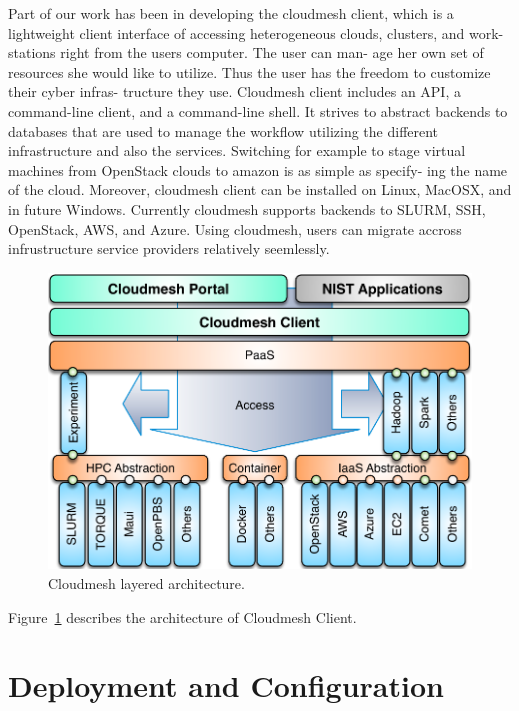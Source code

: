 \documentclass[9pt,twocolumn,twoside]{styles/osajnl}
\begin{document}
Part of our work has been in developing the cloudmesh client, which is
a lightweight client interface of accessing heterogeneous clouds,
clusters, and work- stations right from the users computer. The user
can man- age her own set of resources she would like to utilize. Thus
the user has the freedom to customize their cyber infras- tructure
they use. Cloudmesh client includes an API, a command-line client, and
a command-line shell. It strives to abstract backends to databases
that are used to manage the workflow utilizing the different
infrastructure and also the services. Switching for example to stage
virtual machines from OpenStack clouds to amazon is as simple as
specify- ing the name of the cloud. Moreover, cloudmesh client can be
installed on Linux, MacOSX, and in future Windows.  Currently
cloudmesh supports backends to SLURM, SSH, OpenStack, AWS, and
Azure. Using cloudmesh, users can migrate accross infrustructure
service providers relatively seemlessly.


\begin{figure}[htb]
  \centering
     \includegraphics[width=1.0\columnwidth]{images/cloudmesh-arch-1.pdf}
  \caption{Cloudmesh layered architecture.} 
  \label{F:cloudmesh-arch}
\end{figure}


Figure~\ref{F:cloudmesh-arch} describes the architecture of Cloudmesh Client.

\section{Deployment and Configuration}
\end{document}

